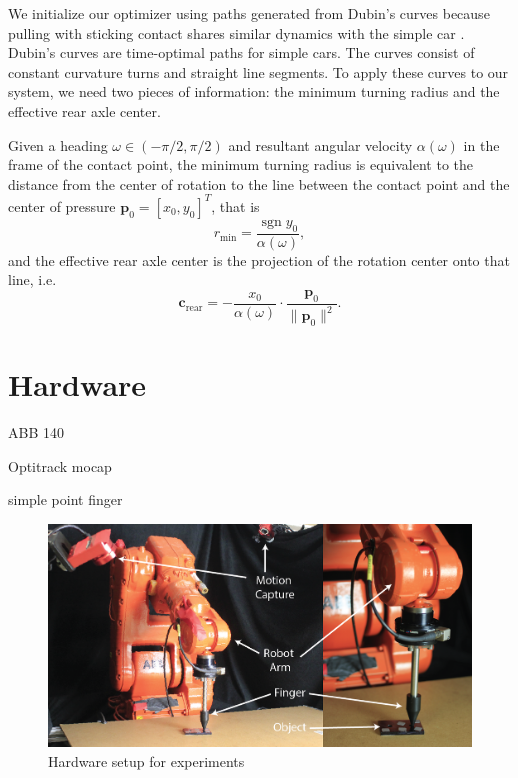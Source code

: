 \documentclass[conference]{IEEEtran}
\DeclareMathOperator{\sign}{\text{sgn}}
\begin{document}
We initialize our optimizer using paths generated from Dubin's curves
\cite{dubins1957curves} because pulling with sticking contact shares
similar dynamics with the simple car \cite{lavalle1999planning}.
Dubin's curves are time-optimal paths for simple cars. The curves
consist of constant curvature turns and straight line segments. To
apply these curves to our system, we need two pieces of information:
the minimum turning radius and the effective rear axle center. 

Given a heading $\omega \in (-\pi/2,\pi/2) $ and resultant angular velocity
$\alpha(\omega)$ in the frame of the contact point, the minimum
turning radius is equivalent to the distance from the center of
rotation to the line between the contact point and the center of
pressure $\mathbf{p}_0 = [x_0,y_0]^T$, that is
\begin{equation}
  r_{\text{min}} = \frac{\sign y_0}{\alpha(\omega)},
\end{equation}
and the effective rear axle center is the projection of the rotation center onto that line, i.e.
\begin{equation}
  \mathbf{c}_{\text{rear}} = -\frac{x_0}{\alpha(\omega)}\cdot\frac{\mathbf{p}_0}{\lVert \mathbf{p}_0 \rVert^2}.
\end{equation}

\section{Hardware}

\begin{inparaenum}
\item ABB 140
\item Optitrack mocap
\item simple point finger
\end{inparaenum}

\begin{figure}
\begin{center}
  \includegraphics[width=\columnwidth]{fig/hardware.png}
\end{center}
\caption{Hardware setup for experiments}
\label{fig:hardware}
\end{figure}
\end{document}
